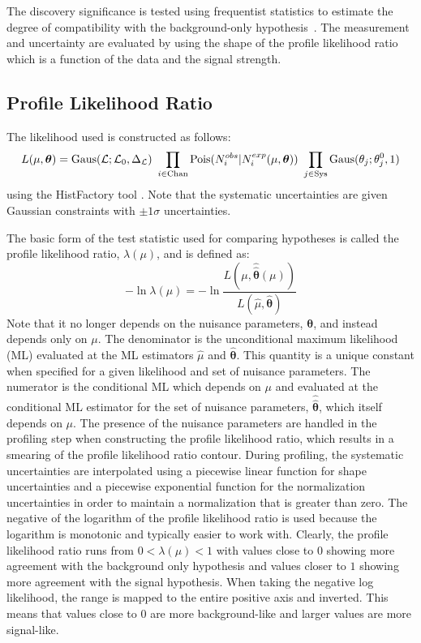 The discovery significance is tested using frequentist statistics
to estimate the degree of compatibility with the background-only 
hypothesis~\cite{Cowan:1277304}.
The measurement and uncertainty are evaluated 
by using the shape of the profile likelihood ratio~\cite{PDG:2014} 
which is a function of the data and the signal strength.

\subsection{Profile Likelihood Ratio}

The likelihood used is constructed as follows:
\begin{equation}
L(\mu,\boldsymbol{\theta}) = \mathrm{Gaus}(\mathcal{L};\mathcal{L}_0,\Delta_{\mathcal{L}})~\prod_{i\in\mathrm{Chan}} \mathrm{Pois}(N_i^{obs}|N_i^{exp}(\mu,\boldsymbol{\theta}))~\prod_{j\in\mathrm{Sys}} \mathrm{Gaus}(\theta_j;\theta_j^0,1)
\label{eq:poisson_likelihood}
\end{equation}
using the HistFactory tool \cite{Cranmer:1456844}. 
Note that the systematic uncertainties are given Gaussian 
constraints with $\pm1\sigma$ uncertainties.

The basic form of the 
test statistic used for comparing hypotheses is called the profile likelihood 
ratio, $\lambda(\mu)$, and is defined as:
\begin{equation}
-\ln \lambda(\mu) = - \ln \frac{L(\mu,\hat{\hat{\boldsymbol{\theta}}}(\mu))}{L(\hat{\mu},\hat{\boldsymbol{\theta}})}
\label{eq:profile_likelihood_ratio}
\end{equation}
Note that it no longer depends on the nuisance parameters, $\boldsymbol{\theta}$,
and instead depends only on $\mu$. 
The denominator is the 
unconditional maximum likelihood (ML)
evaluated at the ML estimators $\hat{\mu}$ and $\hat{\boldsymbol{\theta}}$.
This quantity is a unique constant when specified for a given likelihood
and set of nuisance parameters.
The numerator is the conditional ML which depends on $\mu$ and
evaluated at 
the conditional ML estimator for the set of nuisance parameters, 
$\hat{\hat{\boldsymbol{\theta}}}$, which itself depends on $\mu$.
The presence of the nuisance parameters are handled in the profiling 
step when constructing the profile likelihood ratio,  which results 
in a smearing of the profile likelihood ratio contour. 
During profiling, the systematic uncertainties are
interpolated using a piecewise linear function for shape uncertainties
and a piecewise exponential function for the normalization uncertainties
in order to maintain a normalization that is greater than zero.
The negative of the logarithm of the profile likelihood 
ratio is used because
the logarithm is monotonic and typically easier to work with.
Clearly, the profile likelihood ratio runs from $0 < \lambda(\mu) < 1$
with values close to $0$ showing more agreement with the background 
only hypothesis and values closer to $1$ showing more agreement with 
the signal hypothesis.
When taking the negative log likelihood, the range
is mapped to the entire positive axis and inverted. This means
that values close to $0$ are more background-like and larger values 
are more signal-like.  

